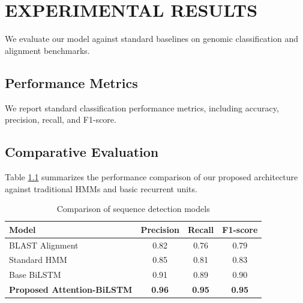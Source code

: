 \chapter{EXPERIMENTAL RESULTS}
\label{ch:results}

We evaluate our model against standard baselines on genomic classification and alignment benchmarks.

\section{Performance Metrics}
We report standard classification performance metrics, including accuracy, precision, recall, and F1-score.

\section{Comparative Evaluation}
Table \ref{tab:comparison} summarizes the performance comparison of our proposed architecture against traditional HMMs and basic recurrent units.

\begin{table}[H]
\centering
\caption{Comparison of sequence detection models}
\label{tab:comparison}
\begin{tabular}{lccc}
\toprule
\textbf{Model} & \textbf{Precision} & \textbf{Recall} & \textbf{F1-score} \\
\midrule
BLAST Alignment & 0.82 & 0.76 & 0.79 \\
Standard HMM & 0.85 & 0.81 & 0.83 \\
Base BiLSTM & 0.91 & 0.89 & 0.90 \\
\textbf{Proposed Attention-BiLSTM} & \textbf{0.96} & \textbf{0.95} & \textbf{0.95} \\
\bottomrule
\end{tabular}
\end{table}

